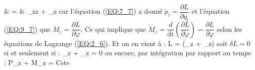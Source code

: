\begin{itemize}
			& = & _{z}\delta z + _{z}\delta\varphi
		\eea
		car l'\'equation (\ref{EQ:7_7}) a donn\'e $\dot{p}_{i} = \dfrac{\partial L}{\partial q_{i}}$ et l'\'equation (\ref{EQ:9_7}) que $M_{z} = \dfrac{\partial L}{\partial\dot{\varphi}}$. Ce qui implique que $\dot{M}_{z} = \dfrac{d}{\mathrm{dt}}\left(\dfrac{\partial L}{\partial\dot{\varphi}}\right) = \dfrac{\partial L}{\partial\varphi}$ selon les \'equations de Lagrange (\ref{EQ:2_6}). Et on en vient \`a :
		\be
			\forall \delta\varphi\text{, }\delta L = \delta\varphi\left(_{z} + _{z}\right)
		\ee
		soit $\delta L = 0$ si et seulement si :
		\be
			_{z} + _{z} = 0
		\ee
		ou encore, par int\'egration par rapport au temps :
		\be
			P_{z} + M_{z} = Cste
		\ee
\end{itemize}